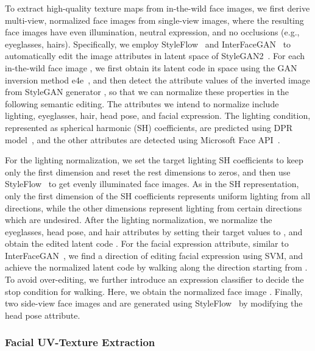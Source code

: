 \documentclass[10pt,twocolumn,letterpaper]{article}
\begin{document}
To extract high-quality texture maps from in-the-wild face images, we first derive multi-view, normalized face images from single-view images, where the resulting face images have even illumination, neutral expression, and no occlusions (e.g., eyeglasses, hairs).
Specifically, we employ StyleFlow~\cite{abdal2021styleflow} and InterFaceGAN~\cite{shen2020interpreting} to automatically edit the image attributes in  latent space of StyleGAN2~\cite{karras2020analyzing}. 
For each in-the-wild face image , we first obtain its latent code  in  space using the GAN inversion method e4e~\cite{tov2021designing}, and then detect the attribute values of the inverted image  from StyleGAN generator , so that we can normalize these properties in the following semantic editing.
The attributes we intend to normalize include lighting, eyeglasses, hair, head pose, and facial expression. 
The lighting condition, represented as spherical harmonic (SH) coefficients, are predicted using DPR model~\cite{zhou2019deep}, and the other attributes are detected using Microsoft Face API~\cite{msapi}.


For the lighting normalization, we set the target lighting SH coefficients to keep only the first dimension and reset the rest dimensions to zeros, and then use StyleFlow~\cite{abdal2021styleflow} to get evenly illuminated face images. 
As in the SH representation, only the first dimension of the SH coefficients represents uniform lighting from all directions, while the other dimensions represent lighting from certain directions which are undesired. 
After the lighting normalization, we normalize the eyeglasses, head pose, and hair attributes by setting their target values to , and obtain the edited latent code .
For the facial expression attribute, similar to InterFaceGAN~\cite{shen2020interpreting}, we find a direction  of editing facial expression using SVM, and achieve the normalized latent code  by walking along the direction  starting from .
To avoid over-editing, we further introduce an expression classifier to decide the stop condition for walking.
Here, we obtain the normalized face image .
Finally, two side-view face images  and  are generated using StyleFlow~\cite{abdal2021styleflow} by modifying the head pose attribute. 


\vspace{-3mm}
\subsubsection{Facial UV-Texture Extraction}
\label{sec:tex-extract}
\vspace{-2mm}
\end{document}
